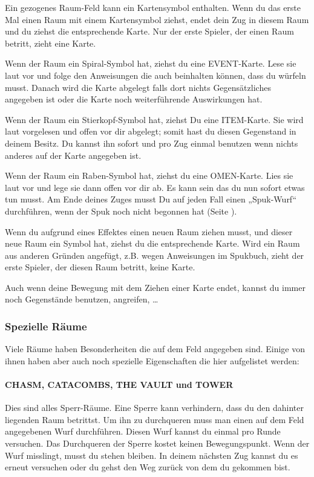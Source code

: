 Ein gezogenes Raum-Feld kann ein Kartensymbol enthalten. Wenn du das erste Mal einen Raum mit einem Kartensymbol ziehst, endet dein Zug in diesem Raum und du ziehst die entsprechende Karte. Nur der erste Spieler, der einen Raum betritt, zieht eine Karte.

Wenn der Raum ein Spiral-Symbol hat, ziehst du eine EVENT-Karte. Lese sie laut vor und folge den Anweisungen die auch beinhalten können, dass du würfeln musst. Danach wird die Karte abgelegt falls dort nichts Gegensätzliches angegeben ist oder die Karte noch weiterführende Auswirkungen hat.

Wenn der Raum ein Stierkopf-Symbol hat, ziehst Du eine ITEM-Karte. Sie wird laut vorgelesen und offen vor dir abgelegt; somit hast du diesen Gegenstand in deinem Besitz. Du kannst ihn sofort und pro Zug einmal benutzen wenn nichts anderes auf der Karte
angegeben ist.

Wenn der Raum ein Raben-Symbol hat, ziehst du eine OMEN-Karte. Lies sie laut vor und lege sie dann offen vor dir ab. Es kann sein das du nun sofort etwas tun musst. Am Ende deines Zuges musst Du auf jeden Fall einen „Spuk-Wurf“ durchführen, wenn der Spuk noch nicht begonnen hat (Seite \pageref{kap:rule:makehauntroll}).

Wenn du aufgrund eines Effektes einen neuen Raum ziehen musst, und dieser neue Raum ein Symbol hat, ziehst du die entsprechende Karte. Wird ein Raum aus anderen Gründen angefügt, z.B. wegen Anweisungen im Spukbuch, zieht der erste Spieler, der diesen Raum betritt, keine Karte.

Auch wenn deine Bewegung mit dem Ziehen einer Karte endet, kannst du immer noch Gegenstände benutzen, angreifen, …

\subsubsection{Spezielle Räume}
\label{kap:rules:specialrooms}

Viele Räume haben Besonderheiten die auf dem Feld angegeben sind. Einige von ihnen haben aber auch noch spezielle Eigenschaften die hier aufgelistet werden:

\paragraph{CHASM, CATACOMBS, THE VAULT und TOWER}

Dies sind alles Sperr-Räume. Eine Sperre kann verhindern, dass du den dahinter liegenden Raum betrittst. Um ihn zu durchqueren muss man einen auf dem Feld angegebenen Wurf durchführen. Diesen Wurf kannst du einmal pro Runde versuchen. Das Durchqueren der Sperre kostet keinen Bewegungspunkt. Wenn der Wurf misslingt, musst du stehen bleiben. In deinem nächsten Zug kannst du es erneut versuchen oder du gehst den Weg zurück von dem du gekommen bist.

